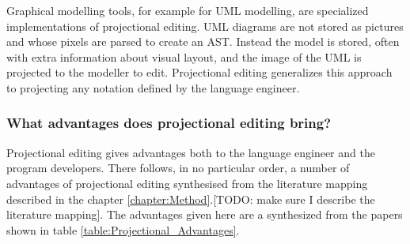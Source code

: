 Graphical modelling tools, for example for UML modelling, are specialized implementations of projectional editing.
UML diagrams are not stored as pictures and whose pixels are parsed to create an AST.
Instead the model is stored, often with extra information about visual layout, and the image of the UML is projected to the modeller to edit.
Projectional editing generalizes this approach to projecting any notation defined by the language engineer.


\subsubsection{What advantages does projectional editing bring?}

Projectional editing gives advantages both to the language engineer and the program developers.
There follows, in no particular order, a number of advantages of projectional editing synthesised from the literature mapping described in the chapter \ref{chapter:Method}.[TODO: make sure I describe the literature mapping].
The advantages given here are a synthesized from the papers shown in table \ref{table:Projectional_Advantages}.

